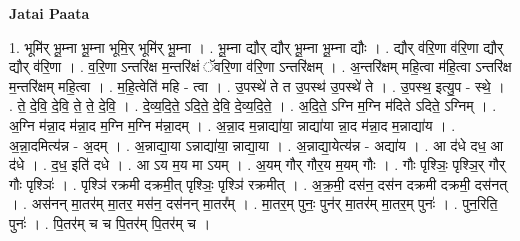 \documentclass[17pt]{extarticle}
\begin{document}
\textbf{Jatai Paata} \newline

1. भूमि॑र् भू॒म्ना भू॒म्ना भूमि॒र् भूमि॑र् भू॒म्ना । . भू॒म्ना द्यौर् द्यौर् भू॒म्ना भू॒म्ना द्यौः । . द्यौर् व॑रि॒णा व॑रि॒णा द्यौर् द्यौर् व॑रि॒णा । . व॒रि॒णा ऽन्तरि॑क्ष म॒न्तरि॑क्षं ॅवरि॒णा व॑रि॒णा ऽन्तरि॑क्षम् । . अ॒न्तरि॑क्षम् महि॒त्वा म॑हि॒त्वा ऽन्तरि॑क्ष म॒न्तरि॑क्षम् महि॒त्वा । . म॒हि॒त्वेति॑ महि - त्वा । . उ॒पस्थे॑ ते त उ॒पस्थ॑ उ॒पस्थे॑ ते । . उ॒पस्थ॒ इत्यु॒प - स्थे॒ । . ते॒ दे॒वि॒ दे॒वि॒ ते॒ ते॒ दे॒वि॒ । . दे॒व्य॒दि॒ते॒ ऽदि॒ते॒ दे॒वि॒ दे॒व्य॒दि॒ते॒ । . अ॒दि॒ते॒ ऽग्नि म॒ग्नि म॑दिते ऽदिते॒ ऽग्निम् । . अ॒ग्नि म॑न्ना॒द म॑न्ना॒द म॒ग्नि म॒ग्नि म॑न्ना॒दम् । . अ॒न्ना॒द म॒न्नाद्या॑या॒ न्नाद्या॑या न्ना॒द म॑न्ना॒द म॒न्नाद्या॑य । . अ॒न्ना॒दमित्य॑न्न - अ॒दम् । . अ॒न्नाद्या॒या ऽन्नाद्या॑या॒ न्नाद्या॒या । . अ॒न्नाद्या॒येत्य॑न्न - अद्या॑य । . आ द॑धे दध॒ आ द॑धे । . द॒ध॒ इति॑ दधे । . आ ऽय म॒य मा ऽयम् । . अ॒यम् गौर् गौर॒य म॒यम् गौः । . गौः पृश्ञिः॒ पृश्ञि॒र् गौर् गौः पृश्ञिः॑ । . पृश्ञि॑ रक्रमी दक्रमी॒त् पृश्ञिः॒ पृश्ञि॑ रक्रमीत् । . अ॒क्र॒मी॒ दस॑न॒ दस॑न दक्रमी दक्रमी॒ दस॑नत् । . अस॑नन् मा॒तर॑म् मा॒तर॒ मस॑न॒ दस॑नन् मा॒तर᳚म् । . मा॒तर॒म् पुनः॒ पुन॑र् मा॒तर॑म् मा॒तर॒म् पुनः॑ । . पुन॒रिति॒ पुनः॑ । . पि॒तर॑म् च च पि॒तर॑म् पि॒तर॑म् च । \newline
\end{document}
